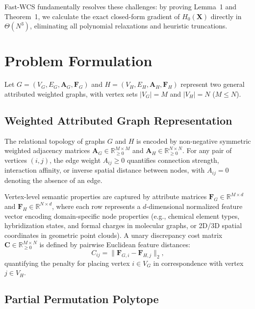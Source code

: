 \documentclass[conference]{IEEEtran}
\begin{document}
Fast-WCS fundamentally resolves these challenges: by proving Lemma~1 and Theorem~1, we calculate the exact closed-form gradient of $H_0(\mathbf{X})$ directly in $\Theta(N^3)$, eliminating all polynomial relaxations and heuristic truncations.


\section{Problem Formulation}
\label{sec:formulation}

Let $G = (V_G, E_G, \mathbf{A}_G, \mathbf{F}_G)$ and $H = (V_H, E_H, \mathbf{A}_H, \mathbf{F}_H)$ represent two general attributed weighted graphs, with vertex sets $|V_G| = M$ and $|V_H| = N$ ($M \leq N$).

\subsection{Weighted Attributed Graph Representation}

The relational topology of graphs $G$ and $H$ is encoded by non-negative symmetric weighted adjacency matrices $\mathbf{A}_G \in \mathbb{R}_{\geq 0}^{M \times M}$ and $\mathbf{A}_H \in \mathbb{R}_{\geq 0}^{N \times N}$. For any pair of vertices $(i, j)$, the edge weight $A_{ij} \geq 0$ quantifies connection strength, interaction affinity, or inverse spatial distance between nodes, with $A_{ij} = 0$ denoting the absence of an edge.

Vertex-level semantic properties are captured by attribute matrices $\mathbf{F}_G \in \mathbb{R}^{M \times d}$ and $\mathbf{F}_H \in \mathbb{R}^{N \times d}$, where each row represents a $d$-dimensional normalized feature vector encoding domain-specific node properties (e.g., chemical element types, hybridization states, and formal charges in molecular graphs, or 2D/3D spatial coordinates in geometric point clouds). A unary discrepancy cost matrix $\mathbf{C} \in \mathbb{R}_{\geq 0}^{M \times N}$ is defined by pairwise Euclidean feature distances:
\begin{equation}
C_{ij} = \|\mathbf{F}_{G, i} - \mathbf{F}_{H, j}\|_2,
\label{eq:unary_cost}
\end{equation}
quantifying the penalty for placing vertex $i \in V_G$ in correspondence with vertex $j \in V_H$.

\subsection{Partial Permutation Polytope}
\end{document}
